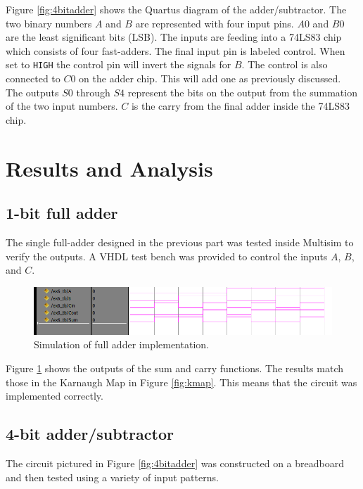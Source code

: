 \documentclass[CMPE]{KGCOEReport}
\begin{document}
Figure \ref{fig:4bitadder} shows the Quartus diagram of the adder/subtractor. The two binary numbers $A$ and $B$ are represented with four input pins. $A0$ and $B0$ are the least significant bits (LSB). The inputs are feeding into a 74LS83 chip which consists of four fast-adders. The final input pin is labeled control. When set to \texttt{HIGH} the control pin will invert the signals for $B$. The control is also connected to $C0$ on the adder chip. This will add one as previously discussed. \\

The outputs $S0$ through $S4$ represent the bits on the output from the summation of the two input numbers. $C$ is the carry from the final adder inside the 74LS83 chip.

\section*{Results and Analysis}

\subsection*{1-bit full adder}

The single full-adder designed in the previous part was tested inside Multisim to verify the outputs. A VHDL test bench was provided to control the inputs $A$, $B$, and $C$.

\begin{figure}[h!]
	\centering
	\includegraphics[width=\textwidth]{1-bit_full_vhdl}
	\caption{Simulation of full adder implementation.}
	\label{fig:simulation}
\end{figure}

Figure \ref{fig:simulation} shows the outputs of the sum and carry functions. The results match those in the Karnaugh Map in Figure \ref{fig:kmap}. This means that the circuit was implemented correctly.

\subsection*{4-bit adder/subtractor}

The circuit pictured in Figure \ref{fig:4bitadder} was constructed on a breadboard and then tested using a variety of input patterns.
\end{document}
